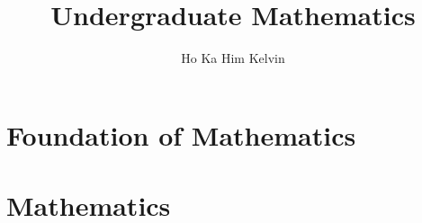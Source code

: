 \documentclass{book}
\title{Undergraduate Mathematics}
\author{Ho Ka Him Kelvin}
\renewcommand{\|}{\biggr|}
\begin{document}
\maketitle
     
    \tableofcontents
    \part{Foundation of Mathematics}
    
    
    
    
    \part{Mathematics}
    \setcounter{thm}{0}
    \setcounter{cor}{0}
    \setcounter{defn}{0}
    \setcounter{lem}{0}
    \setcounter{rem}{0}
    \setcounter{prop}{0}
    \setcounter{ax}{0}
    \setcounter{para}{0}
    
    
    
    
    
\end{document}
